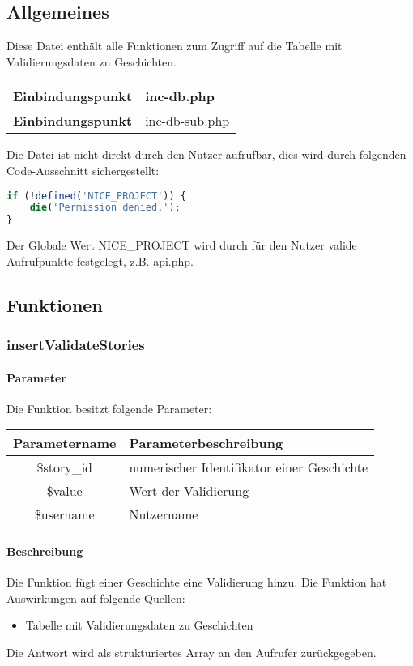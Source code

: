 \subsection{Allgemeines} Diese Datei enthält alle Funktionen zum Zugriff auf die Tabelle mit Validierungsdaten zu Geschichten.
\begin{table}[H]
	\begin{tabular}{|c|p{11cm}|}
		\hline
		\textbf{Einbindungspunkt} & inc-db.php \\ \hline
		\textbf{Einbindungspunkt} & inc-db-sub.php \\ \hline
	\end{tabular}
\end{table}
Die Datei ist nicht direkt durch den Nutzer aufrufbar, dies wird durch folgenden Code-Ausschnitt sichergestellt:
\begin{lstlisting}[language=php]
if (!defined('NICE_PROJECT')) {
	die('Permission denied.');
}
\end{lstlisting}
Der Globale Wert {\glqq NICE\_PROJECT\grqq} wird durch für den Nutzer valide Aufrufpunkte festgelegt, z.B. {\glqq api.php\grqq}.
\newpage
\subsection{Funktionen}
\subsubsection{insertValidateStories}
\paragraph{Parameter} Die Funktion besitzt folgende Parameter:
\begin{table}[H]
	\begin{tabular}{|c|p{11cm}|}
		\hline
		\textbf{Parametername} & \textbf{Parameterbeschreibung} \\ \hline
		\$story\_id & numerischer Identifikator einer Geschichte \\ \hline
		\$value     & Wert der Validierung \\ \hline
		\$username  & Nutzername \\ \hline
	\end{tabular}
\end{table}
\paragraph{Beschreibung} Die Funktion fügt einer Geschichte eine Validierung hinzu. Die Funktion hat Auswirkungen auf folgende Quellen:
\begin{itemize}
	\item Tabelle mit Validierungsdaten zu Geschichten
\end{itemize}
Die Antwort wird als strukturiertes Array an den Aufrufer zurückgegeben.
